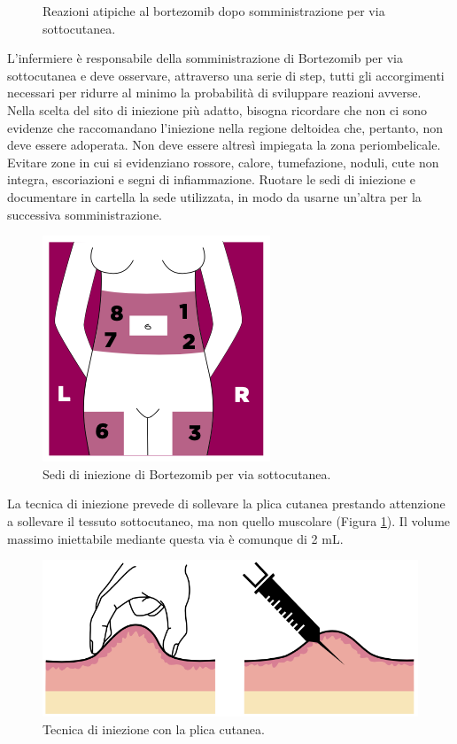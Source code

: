 \begin{figure}[H]
\begin{center}
\begin{subfigure}[b]{0.7\textwidth}
    
        \end{subfigure}
    \end{center} 
    \caption{Reazioni atipiche al bortezomib dopo somministrazione per via sottocutanea\cite{BORTEZOMIB}.}
    
\end{figure}

L’infermiere è responsabile della somministrazione di Bortezomib per via sottocutanea e deve osservare,
attraverso una serie di step, tutti gli accorgimenti necessari per ridurre al minimo la probabilità di sviluppare 
reazioni avverse.\\ 
Nella scelta del sito di iniezione più adatto, bisogna ricordare che non ci sono evidenze che raccomandano l’iniezione 
nella regione deltoidea che, pertanto, non deve essere adoperata. Non deve essere altresì impiegata la zona periombelicale.
Evitare zone in cui si evidenziano rossore, calore, 
tumefazione, noduli, cute non integra, escoriazioni e segni di infiammazione. 
Ruotare le sedi di iniezione e documentare in cartella la sede utilizzata, in modo da usarne 
un’altra per la successiva somministrazione\cite{BORTNURSES}.

\begin{figure}[H]
    \begin{center}
    \includegraphics[width=0.3\columnwidth]{img/SEDI.png}
    \vspace{-3mm}
    \end{center}
    \caption{ Sedi di iniezione di Bortezomib per via sottocutanea.
    \cite{BORTEZOMIB}}

\end{figure}

La tecnica di iniezione prevede di sollevare la plica cutanea prestando attenzione a sollevare il tessuto 
sottocutaneo, ma non quello muscolare (Figura \ref{fig:FIGURE_3.6}). 
Il volume massimo iniettabile mediante questa via è comunque di 2 mL.

\begin{figure}[H]
    \begin{center}
    \includegraphics[width=0.5\columnwidth]{img/PLICA.png}
    \vspace{-3mm}
    \end{center}
    \caption{ Tecnica di iniezione con la plica cutanea.
    \cite{BORTEZOMIB}}
    \label{fig:FIGURE_3.6}
\end{figure}

